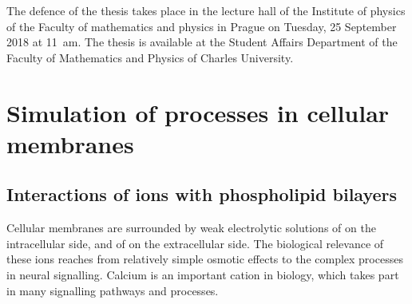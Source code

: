 \documentclass[12pt,a4paper,twoside,openright]{report}
\begin{document}
The defence of the thesis takes place
in the lecture hall of the Institute of physics 
of the Faculty of mathematics and physics in Prague
on Tuesday, 25 September 2018 at 11~am. 
The thesis is available at the Student Affairs Department of the Faculty of
Mathematics and Physics of Charles University. 


\newpage



\tableofcontents



\newpage











\chapter*{Simulation of processes in cellular membranes}



\section*{Interactions of ions with phospholipid bilayers}

Cellular membranes are surrounded by 
weak electrolytic solutions of  on the intracellular side, 
and of  on the extracellular side. 
The biological relevance of these ions reaches from relatively simple osmotic effects to the complex processes in neural signalling. \citep{Knudsen_book2002} 
Calcium is an important cation in biology, 
which takes part in many signalling pathways and processes. 
\end{document}
